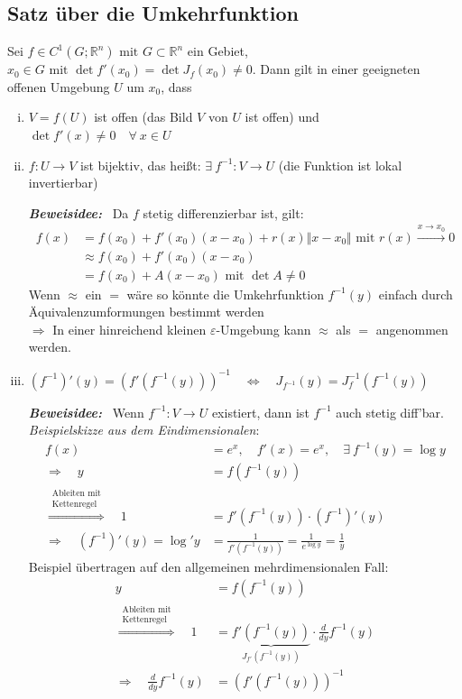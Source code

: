 \documentclass[11pt,a4paper]{book}
\newcommand {\Rn}	{\mathbb{R}^n}
\newcommand{\1}    	{\mathbbm{1}}
\newcommand{\mitt}	{\textrm{ mit }}
\newcommand{\fum}	{f^{-1}}
\newcommand{\Beweis}[1][Beweis]
{\begin{mdframed}[backgroundcolor=gray!10,linewidth=0pt]\noindent\textit{\textbf{{#1}:}}~}
\newcommand{\QED}	{\end{mdframed}}
\begin{document}
\subsection{Satz über die Umkehrfunktion}
Sei \(f \in C^1(G;\Rn) \mitt G\subset \Rn\) ein Gebiet, \(x_0 \in G \mitt \det f'(x_0) = \det J_f(x_0) \neq 0\). Dann gilt in einer geeigneten offenen Umgebung \(U\) um \(x_0\), dass
\begin{enumerate}[(i)]
	\item \(V=f(U)\) ist offen (das Bild \(V\) von \(U\) ist offen) und \(\det f'(x) \neq 0 \quad \forall~ x \in U\)
	\item \(f: U \rightarrow V\) ist bijektiv, das heißt: \(\exists~ f^{-1} : V \rightarrow U \) (die Funktion ist lokal invertierbar)
	\Beweis[Beweisidee]
	Da \(f\) stetig differenzierbar ist, gilt:
	\begin{align*}
		f(x) &= f(x_0) + f'(x_0)(x-x_0) + r(x)\Vert x - x_0 \Vert \mitt r(x) \stackrel{x \rightarrow x_0}{\rightarrow} 0 \\
		&\approx f(x_0) + f'(x_0)(x-x_0) \\
		&= f(x_0) + A(x-x_0) \mitt \det A \neq 0
	\end{align*}
	Wenn \(\approx\) ein \(=\) wäre so könnte die Umkehrfunktion \(f^{-1}(y)\) einfach durch Äquivalenzumformungen bestimmt werden \\
	\(\Rightarrow\) In einer hinreichend kleinen \(\varepsilon\)-Umgebung kann \(\approx\) als \(=\) angenommen werden.
	\QED
	\item \( \left( f^{-1} \right)'(y) = \left( f'\left( f^{-1}(y) \right) \right)^{-1} \quad\Leftrightarrow\quad J_{f^{-1}}(y) = J_f^{-1}\left( f^{-1}(y) \right)\)
	\Beweis[Beweisidee] Wenn \(\fum : V \rightarrow U\) existiert, dann ist \(\fum\) auch stetig diff'bar. \\
	\textit{Beispielskizze aus dem Eindimensionalen}:
	\begin{align*}
		f(x) &= e^x, \quad f'(x) = e^x, \quad \exists~ \fum(y) = \log y \\
		\Rightarrow \quad y &= f\left( \fum(y) \right) \\
		\stackrel{\substack{\textrm{Ableiten mit}\\\textrm{Kettenregel}}}{\Rightarrow} \quad
		1 &= f'\left( \fum(y) \right) \cdot (\fum)'(y) \\
		\Rightarrow \quad (\fum)'(y) = \log' y &= \frac{1}{f'\left( \fum(y) \right)} = \frac{1}{e^{\log y}} = \frac{1}{y}
	\end{align*}
	Beispiel übertragen auf den allgemeinen mehrdimensionalen Fall:
	\begin{align*}
		y &= f\left( \fum(y) \right) \\
		\stackrel{\substack{\textrm{Ableiten mit}\\\textrm{Kettenregel}}}{\Rightarrow} \quad
		1 &= \underbrace{f'\left( \fum(y) \right)}_{J_{f'}\left(\fum(y)\right)} \cdot \frac{d}{dy} \fum(y) \\
		\Rightarrow\quad \frac{d}{dy} \fum(y) &= \left( f'\left( \fum(y) \right)\right)^{-1}
	\end{align*}
	\QED
\end{enumerate}
\end{document}
